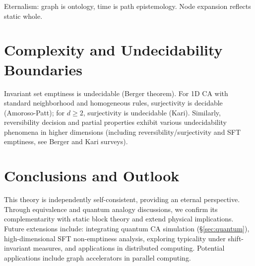 \documentclass[11pt]{article}
\theoremstyle{definition}
\theoremstyle{remark}
\begin{document}
Eternalism: graph is ontology, time is path epistemology. Node expansion reflects static whole.

\section{Complexity and Undecidability Boundaries}\label{sec:complexity}

Invariant set emptiness is undecidable (Berger theorem). For 1D CA with standard neighborhood and homogeneous rules, surjectivity is decidable (Amoroso-Patt); for \( d\ge2 \), surjectivity is undecidable (Kari). Similarly, reversibility decision and partial properties exhibit various undecidability phenomena in higher dimensions (including reversibility/surjectivity and SFT emptiness, see Berger and Kari surveys).

\section{Conclusions and Outlook}\label{sec:conclusions}

This theory is independently self-consistent, providing an eternal perspective. Through equivalence and quantum analogy discussions, we confirm its complementarity with static block theory and extend physical implications. Future extensions include: integrating quantum CA simulation (§\ref{sec:quantum}), high-dimensional SFT non-emptiness analysis, exploring typicality under shift-invariant measures, and applications in distributed computing. Potential applications include graph accelerators in parallel computing.
\end{document}
